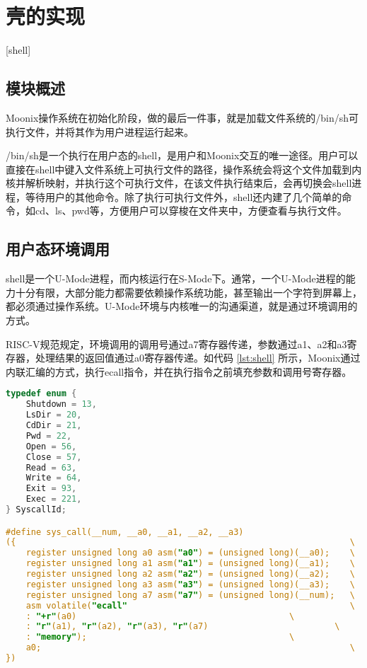 
\chapter{壳的实现}[shell]
\label{chapter:shell}

\section{模块概述}

Moonix操作系统在初始化阶段，做的最后一件事，就是加载文件系统的/bin/sh可执行文件，并将其作为用户进程运行起来。

/bin/sh是一个执行在用户态的shell，是用户和Moonix交互的唯一途径。用户可以直接在shell中键入文件系统上可执行文件的路径，操作系统会将这个文件加载到内核并解析映射，并执行这个可执行文件，在该文件执行结束后，会再切换会shell进程，等待用户的其他命令。除了执行可执行文件外，shell还内建了几个简单的命令，如cd、ls、pwd等，方便用户可以穿梭在文件夹中，方便查看与执行文件。

\section{用户态环境调用}

shell是一个U-Mode进程，而内核运行在S-Mode下。通常，一个U-Mode进程的能力十分有限，大部分能力都需要依赖操作系统功能，甚至输出一个字符到屏幕上，都必须通过操作系统。U-Mode环境与内核唯一的沟通渠道，就是通过环境调用的方式。

RISC-V规范规定，环境调用的调用号通过a7寄存器传递，参数通过a1、a2和a3寄存器，处理结果的返回值通过a0寄存器传递。如代码 \ref{lst:shell} 所示，Moonix通过内联汇编的方式，执行ecall指令，并在执行指令之前填充参数和调用号寄存器。

\begin{minipage}[c]{0.95\textwidth}
\begin{lstlisting}[language={C}, caption={U-Mode环境调用}, label={lst:shell}]
typedef enum {
	Shutdown = 13,
	LsDir = 20,
	CdDir = 21,
	Pwd = 22,
	Open = 56,
	Close = 57,
	Read = 63,
	Write = 64,
	Exit = 93,
	Exec = 221,
} SyscallId;

#define sys_call(__num, __a0, __a1, __a2, __a3)                          \
({                                                                  \
	register unsigned long a0 asm("a0") = (unsigned long)(__a0);    \
	register unsigned long a1 asm("a1") = (unsigned long)(__a1);    \
	register unsigned long a2 asm("a2") = (unsigned long)(__a2);    \
	register unsigned long a3 asm("a3") = (unsigned long)(__a3);    \
	register unsigned long a7 asm("a7") = (unsigned long)(__num);   \
	asm volatile("ecall"                                            \
	: "+r"(a0)                                          \
	: "r"(a1), "r"(a2), "r"(a3), "r"(a7)                         \
	: "memory");                                        \
	a0;                                                             \
})
\end{lstlisting}
\end{minipage}

